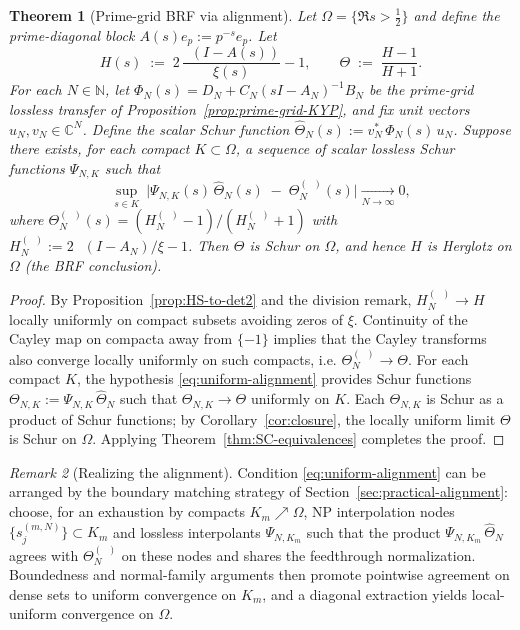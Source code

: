 \documentclass[11pt]{article}
\newtheorem{theorem}{Theorem}
\theoremstyle{definition}
\theoremstyle{remark}
\newtheorem{remark}[theorem]{Remark}
\newcommand{\C}{\mathbb{C}}
\newcommand{\N}{\mathbb{N}}
\DeclareMathOperator{\dettwo}{det_2}
\begin{document}
\begin{theorem}[Prime-grid BRF via alignment]\label{thm:prime-grid-BRF}
Let \(\Omega=\{\Re s>\tfrac12\}\) and define the prime-diagonal block \(A(s)e_p:=p^{-s}e_p\). Let
\[
 H(s)\;:=\;2\,\frac{\dettwo(I-A(s))}{\xi(s)}-1,\qquad \Theta\;:=\;\frac{H-1}{H+1}.
\]
For each \(N\in\N\), let \(\Phi_N(s)=D_N+C_N(sI-A_N)^{-1}B_N\) be the prime-grid lossless transfer of Proposition~\ref{prop:prime-grid-KYP}, and fix unit vectors \(u_N,v_N\in\C^N\). Define the scalar Schur function \(\widehat\Theta_N(s):=v_N^*\,\Phi_N(s)\,u_N\). Suppose there exists, for each compact \(K\subset\Omega\), a sequence of scalar lossless Schur functions \(\Psi_{N,K}\) such that
\begin{equation}\label{eq:uniform-alignment}
 \sup_{s\in K}\ \big|\Psi_{N,K}(s)\,\widehat\Theta_N(s)\; -\; \Theta_N^{(\dettwo)}(s)\big|\xrightarrow[N\to\infty]{}0,
\end{equation}
where \(\Theta_N^{(\dettwo)}(s)=(H_N^{(\dettwo)}-1)/(H_N^{(\dettwo)}+1)\) with \(H_N^{(\dettwo)}:=2\,\dettwo(I-A_N)/\xi-1\). Then \(\Theta\) is Schur on \(\Omega\), and hence \(H\) is Herglotz on \(\Omega\) (the BRF conclusion).
\end{theorem}
\begin{proof}
By Proposition~\ref{prop:HS-to-det2} and the division remark, \(H_N^{(\dettwo)}\to H\) locally uniformly on compact subsets avoiding zeros of \(\xi\). Continuity of the Cayley map on compacta away from \(\{-1\}\) implies that the Cayley transforms also converge locally uniformly on such compacts, i.e. \(\Theta_N^{(\dettwo)}\to\Theta\). For each compact \(K\), the hypothesis \eqref{eq:uniform-alignment} provides Schur functions \(\Theta_{N,K}:=\Psi_{N,K}\,\widehat\Theta_N\) such that \(\Theta_{N,K}\to\Theta\) uniformly on \(K\). Each \(\Theta_{N,K}\) is Schur as a product of Schur functions; by Corollary~\ref{cor:closure}, the locally uniform limit \(\Theta\) is Schur on \(\Omega\). Applying Theorem~\ref{thm:SC-equivalences} completes the proof.
\end{proof}
\begin{remark}[Realizing the alignment]
Condition \eqref{eq:uniform-alignment} can be arranged by the boundary matching strategy of Section~\ref{sec:practical-alignment}: choose, for an exhaustion by compacts \(K_m\nearrow\Omega\), NP interpolation nodes \(\{s_{j}^{(m,N)}\}\subset K_m\) and lossless interpolants \(\Psi_{N,K_m}\) such that the product \(\Psi_{N,K_m}\,\widehat\Theta_N\) agrees with \(\Theta_N^{(\dettwo)}\) on these nodes and shares the feedthrough normalization. Boundedness and normal-family arguments then promote pointwise agreement on dense sets to uniform convergence on \(K_m\), and a diagonal extraction yields local-uniform convergence on \(\Omega\).
\end{remark}
\iffalse %
\end{document}
